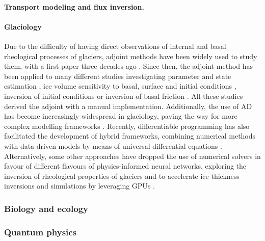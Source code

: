 \paragraph{Transport modeling and flux inversion.}

\paragraph{Glaciology}

Due to the difficulty of having direct observations of internal and basal rheological processes of glaciers, adjoint methods have been widely used to study them, with a first paper three decades ago \cite{macayeal1992basal}. 
Since then, the adjoint method has been applied to many different studies investigating parameter and state estimation \cite{goldberg2013parameter}, ice volume sensitivity to basal, surface and initial conditions \cite{heimbach2009greenland}, inversion of initial conditions \cite{mosbeux2016comparison} or inversion of basal friction \cite{morlighem2013inversion}.
All these studies derived the adjoint with a manual implementation. 
Additionally, the use of AD has become increasingly widespread in glaciology, paving the way for more complex modelling frameworks \cite{hascoet2018source, logan2020sicopolis}. 
Recently, differentiable programming has also facilitated the development of hybrid frameworks, combining numerical methods with data-driven models by means of universal differential equations \cite{BolibarSapienza_UDEs}. 
Alternatively, some other approaches have dropped the use of numerical solvers in favour of different flavours of physics-informed neural networks, exploring the inversion of rheological properties of glaciers \cite{wang2022discovering} and to accelerate ice thickness inversions and simulations by leveraging GPUs \cite{Jouvet_Cordonnier_Kim_Lüthi_Vieli_Aschwanden_2021, jouvet2023inversion}. 


\subsubsection{Biology and ecology}


\subsubsection{Quantum physics}

